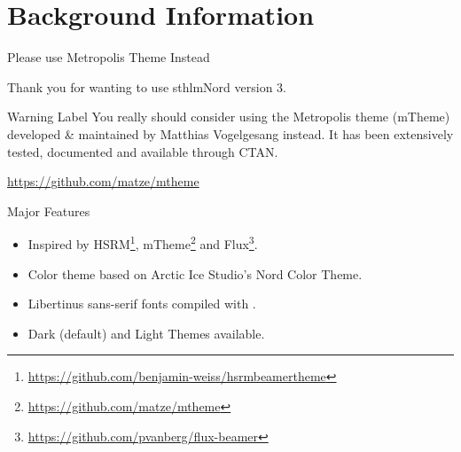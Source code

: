 \documentclass[aspectratio=169, sectionpages]{beamer}
\begin{document}
\section{Background Information}


\begin{frame}{Please use Metropolis Theme Instead}

	Thank you for wanting to use sthlmNord version 3.

	\vspace{1em}
	\begin{alertblock}{Warning Label}
		\alert{You really should consider} using the Metropolis
		theme (mTheme) developed \& maintained by Matthias
		Vogelgesang instead. It has been extensively tested, documented and available through CTAN.
	\end{alertblock}
	\begin{center}
		\url{https://github.com/matze/mtheme}
	\end{center}
\end{frame}


\begin{frame}[c,fragile]{Major Features}

	\begin{itemize}
		\item Inspired by HSRM\footnote{\url{https://github.com/benjamin-weiss/hsrmbeamertheme}},
		      mTheme\footnote{\url{https://github.com/matze/mtheme}} and
		      Flux\footnote{\url{https://github.com/pvanberg/flux-beamer}}.
		\item Color theme based on Arctic Ice Studio's Nord Color Theme.
		\item Libertinus sans-serif fonts compiled with \XeLaTeX.
		\item Dark (default) and Light Themes available.
	\end{itemize}

\end{frame}
\end{document}
